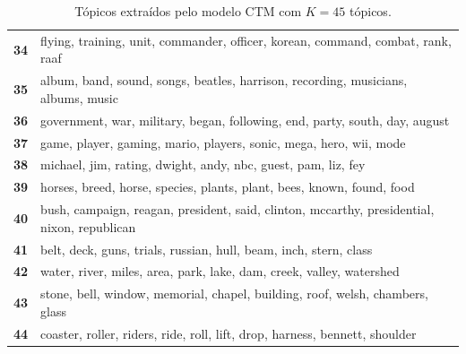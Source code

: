 \begin{table}[htpb]
\begin{tabularx}{\textwidth}{@{}l X@{}}
        \textbf{34} & flying, training, unit, commander, officer, korean, command, combat, rank, raaf \\
        \textbf{35} & album, band, sound, songs, beatles, harrison, recording, musicians, albums, music \\
        \textbf{36} & government, war, military, began, following, end, party, south, day, august \\
        \textbf{37} & game, player, gaming, mario, players, sonic, mega, hero, wii, mode \\
        \textbf{38} & michael, jim, rating, dwight, andy, nbc, guest, pam, liz, fey \\
        \textbf{39} & horses, breed, horse, species, plants, plant, bees, known, found, food \\
        \textbf{40} & bush, campaign, reagan, president, said, clinton, mccarthy, presidential, nixon, republican \\
        \textbf{41} & belt, deck, guns, trials, russian, hull, beam, inch, stern, class \\
        \textbf{42} & water, river, miles, area, park, lake, dam, creek, valley, watershed \\
        \textbf{43} & stone, bell, window, memorial, chapel, building, roof, welsh, chambers, glass \\
        \textbf{44} & coaster, roller, riders, ride, roll, lift, drop, harness, bennett, shoulder \\
        \bottomrule
    \end{tabularx}
    \caption{Tópicos extraídos pelo modelo CTM com $K=45$ tópicos.}
    \label{tab:topicos_ctm_45}
\end{table}
